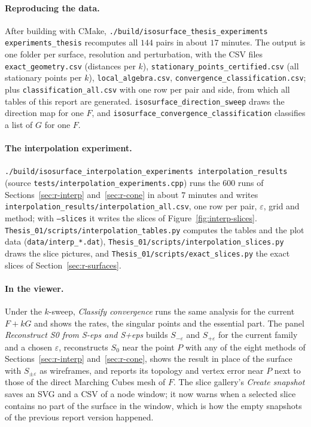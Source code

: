 \documentclass[12pt, a4paper]{article}
\theoremstyle{plain}
\theoremstyle{definition}
\theoremstyle{remark}
\theoremstyle{definition}
\begin{document}
\paragraph{Reproducing the data.} After building with CMake,
\texttt{./build/isosurface\_thesis\_experiments experiments\_thesis} recomputes all
$144$ pairs in about $17$ minutes. The output is one folder per surface,
resolution and perturbation, with the CSV files
\texttt{exact\_geometry.csv} (distances per $k$), \texttt{stationary\_points\_certified.csv}
(all stationary points per $k$), \texttt{local\_algebra.csv},
\texttt{convergence\_classification.csv}; plus \texttt{classification\_all.csv} with one
row per pair and side, from which all tables of this report are generated.
\texttt{isosurface\_direction\_sweep} draws the direction map for one $F$, and
\texttt{isosurface\_convergence\_classification} classifies a list of $G$ for one $F$.

\paragraph{The interpolation experiment.}
\texttt{./build/isosurface\_interpolation\_experiments interpolation\_results}
(source \texttt{tests/interpolation\_experiments.cpp}) runs the $600$ runs of
Sections~\ref{sec:r-interp} and~\ref{sec:r-cone} in about $7$ minutes and writes
\texttt{interpolation\_results/interpolation\_all.csv}, one row per pair, $\varepsilon$,
grid and method; with \texttt{--slices} it writes the slices of
Figure~\ref{fig:interp-slices}. \texttt{Thesis\_01/scripts/interpolation\_tables.py}
computes the tables and the plot data (\texttt{data/interp\_*.dat}),
\texttt{Thesis\_01/scripts/interpolation\_slices.py} draws the slice pictures, and
\texttt{Thesis\_01/scripts/exact\_slices.py} the exact slices of
Section~\ref{sec:r-surfaces}.

\paragraph{In the viewer.} Under the $k$-sweep, \emph{Classify convergence} runs the
same analysis for the current $F+kG$ and shows the rates, the singular points and the
essential part. The panel \emph{Reconstruct S0 from S-eps and S+eps} builds
$S_{-\varepsilon}$ and $S_{+\varepsilon}$ for the current family and a chosen
$\varepsilon$, reconstructs $S_0$ near the point $P$ with any of the eight methods of
Sections~\ref{sec:r-interp} and~\ref{sec:r-cone}, shows the result in place of the
surface with $S_{\pm\varepsilon}$ as wireframes, and reports its topology and vertex
error near $P$ next to those of the direct Marching Cubes mesh of $F$. The slice gallery's \emph{Create snapshot} saves an SVG and a CSV of a
node window; it now warns when a selected slice contains no part of the surface in
the window, which is how the empty snapshots of the previous report version
happened.
\end{document}
